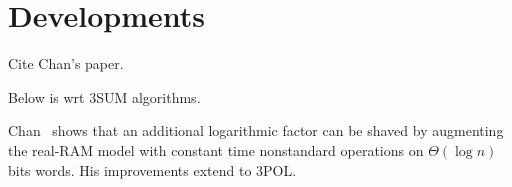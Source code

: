 \section{Developments}

Cite Chan's paper.

Below is wrt 3SUM algorithms.

Chan~\cite{Ch18} shows that an additional logarithmic factor can be shaved
by augmenting the real-RAM model with constant time nonstandard operations on
$\Theta(\log n)$ bits words. His improvements extend to 3POL.
